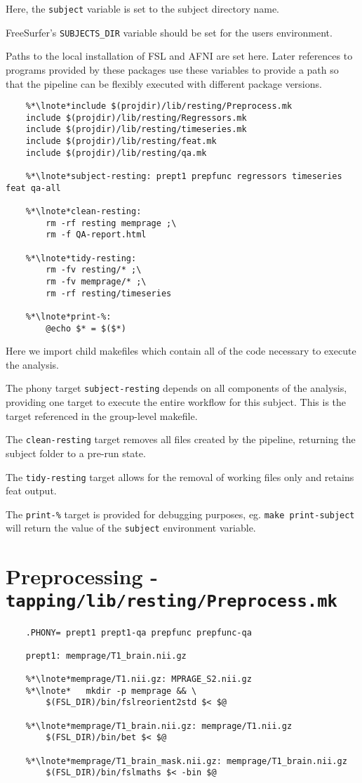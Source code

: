 Here, the \texttt{subject} variable is set to the subject directory name.

FreeSurfer's \texttt{SUBJECTS_DIR} variable should be set for the users environment. 

Paths to the local installation of FSL and AFNI are set here. Later references to programs provided by these packages use these variables to provide a path so that the pipeline can be flexibly executed with different package versions.

\begin{lstlisting}
	%*\lnote*include $(projdir)/lib/resting/Preprocess.mk
	include $(projdir)/lib/resting/Regressors.mk
	include $(projdir)/lib/resting/timeseries.mk
	include $(projdir)/lib/resting/feat.mk
	include $(projdir)/lib/resting/qa.mk
	
	%*\lnote*subject-resting: prept1 prepfunc regressors timeseries feat qa-all
	
	%*\lnote*clean-resting:
		rm -rf resting memprage ;\
		rm -f QA-report.html
	
	%*\lnote*tidy-resting:
		rm -fv resting/* ;\
		rm -fv memprage/* ;\
		rm -rf resting/timeseries
	
	%*\lnote*print-%:
		@echo $* = $($*)
\end{lstlisting}

Here we import child makefiles which contain all of the code necessary to execute the analysis. 

The phony target \texttt{subject-resting} depends on all components of the analysis, providing one target to execute the entire workflow for this subject. This is the target referenced in the group-level makefile.

The \texttt{clean-resting} target removes all files created by the pipeline, returning the subject folder to a pre-run state.

The \texttt{tidy-resting} target allows for the removal of working files only and retains feat output. 

The \texttt{print-\%} target is provided for debugging purposes, eg. \texttt{make print-subject} will return the value of the \texttt{subject} environment variable.

\section{Preprocessing - \texttt{tapping/lib/resting/Preprocess.mk}}
\begin{lstlisting}
	.PHONY= prept1 prept1-qa prepfunc prepfunc-qa
	
	prept1: memprage/T1_brain.nii.gz
	
	%*\lnote*memprage/T1.nii.gz: MPRAGE_S2.nii.gz
	%*\lnote*	mkdir -p memprage && \
		$(FSL_DIR)/bin/fslreorient2std $< $@

	%*\lnote*memprage/T1_brain.nii.gz: memprage/T1.nii.gz
		$(FSL_DIR)/bin/bet $< $@
		
	%*\lnote*memprage/T1_brain_mask.nii.gz: memprage/T1_brain.nii.gz
		$(FSL_DIR)/bin/fslmaths $< -bin $@
\end{lstlisting}

